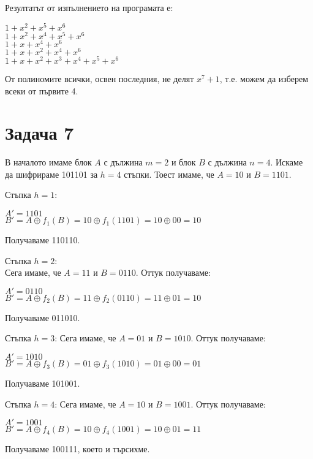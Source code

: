 \documentclass{article}
\begin{document}
\justify
Резултатът от изпълнението на програмата е:

\begin{center}
$1+x^2+x^5+x^6$ \\
$1+x^2+x^4+x^5+x^6$ \\
$1+x+x^4+x^6$ \\
$1+x+x^2+x^4+x^6$ \\
$1+x+x^2+x^3+x^4+x^5+x^6$
\end{center}

\justify
От полиномите всички, освен последния, не делят $x^7 + 1$, т.е. можем да изберем всеки от първите 4.

\section*{Задача 7}

\justify
В началото имаме блок $A$ с дължина $m = 2$ и блок $B$ с дължина $n = 4$. Искаме да шифрираме 101101 за $h = 4$ стъпки. Тоест имаме, че $A = 10$ и $B = 1101$.

\justify
Стъпка $h = 1$:
\begin{center}
    $A' = 1101$ \\
    $B' = A \oplus f_1(B) = 10 \oplus f_1(1101) = 10 \oplus 00 = 10$
\end{center}
Получаваме 110110.

\justify
Стъпка $h = 2$: \\
Сега имаме, че $A = 11$ и $B = 0110$. Оттук получаваме:
\begin{center}
    $A' = 0110$ \\
    $B' = A \oplus f_2(B) = 11 \oplus f_2(0110) = 11 \oplus 01 = 10$
\end{center}
Получаваме 011010.

\justify
Стъпка $h = 3$:
Сега имаме, че $A = 01$ и $B = 1010$. Оттук получаваме:
\begin{center}
    $A' = 1010$ \\
    $B' = A \oplus f_3(B) = 01 \oplus f_3(1010) = 01 \oplus 00 = 01$
\end{center}
Получаваме 101001.

\justify
Стъпка $h = 4$:
Сега имаме, че $A = 10$ и $B = 1001$. Оттук получаваме:
\begin{center}
    $A' = 1001$ \\
    $B' = A \oplus f_4(B) = 10 \oplus f_4(1001) = 10 \oplus 01 = 11$
\end{center}
Получаваме 100111, което и търсихме.
\end{document}
